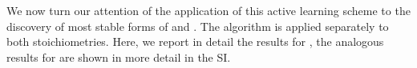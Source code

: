 %



%
We now turn our attention of the application of this active learning scheme to the discovery of most stable forms of \IrOtwo and \IrOthree.
%
The algorithm is applied separately to both stoichiometries.
%
Here, we report in detail the results for \IrOthree, the analogous results for  \IrOtwo are shown in more detail in the SI.


